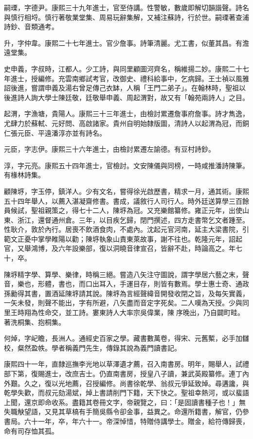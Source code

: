 \begin{pinyinscope}
嗣瑮，字德尹。康熙三十九年進士，官至侍講。性警敏，數歲即解切韻諧聲。詩名與慎行相埒。慎行著敬業堂集、周易玩辭集解，又補注蘇詩，行於世。嗣瑮著查浦詩鈔、音類通考。

升，字仲韋。康熙二十七年進士。官少詹事。詩筆清麗。尤工書，似董其昌。有澹遠堂集。

史申義，字叔時，江都人。少工詩，與同里顧圖河齊名，稱維揚二妙。康熙二十七年進士，授編修。充雲南鄉試考官，改御史、禮科給事中，乞病歸。王士禎以風雅詔後進，嘗謂申義及湯右曾足傳己衣缽，人稱「王門二弟子」。在翰林時，聖祖以後進詩人詢大學士陳廷敬，廷敬舉申義、周起渭對，故又有「翰苑兩詩人」之目。

起渭，字漁塘，貴陽人。康熙三十三年進士，由檢討累遷詹事府詹事。詩才雋逸，尤肆力於蘇軾、元好問、高啟諸家。貴州自明始隸版圖，清詩人以起渭為冠，而銅仁張元臣、平遠潘淳亦並有詩名。

元臣，字志伊。康熙三十六年進士，由檢討累遷左諭德。有豆村詩鈔。

淳，字元亮。康熙五十四年進士，官檢討。文安陳儀與同榜，一時咸推潘詩陳筆。有椽林詩集。

顧陳垿，字玉停，鎮洋人。少有文名，嘗得徐光啟歷書，精求一月，通其術。康熙五十四年舉人，以薦入湛凝齋修書。書成，議敘行人司行人。時外廷送算學三百餘員候試，聖祖親策之，得七十二人，陳垿為冠。又充樂館纂修。雍正元年，出使山東、浙江，還督通州倉。三年，以目疾乞歸，閉門撰述，四方走書幣乞文者踵至。性耿介，敦於內行。居喪不飲酒食肉，不處內。沈起元官河南，延主大梁書院，引範文正憂中掌學睢陽以勸；陳垿執象山責東萊故事，謝不往也。乾隆元年，詔起官，又舉鴻博，及六年設樂部，復以洞曉音律宣召，皆辭不赴，時論高之。年七十，卒。

陳垿精字學、算學、樂律，時稱三絕。嘗造八矢注守圖說，謂字學居六藝之末，聲音，樂也，形體，書也，而口出耳入，手運目存，則皆有數焉。學士惠士奇、通政孫勷得其書，置酒延陳垿請其說。陳垿為言經聲緯音開發收閉之旨，及每矢實義，一矢未發，則聲不能出，字有所避，八矢盡而音定字死矣。二人嘆為天授。少與同里王時翔為性命交，並工詩。婁東詩人大率宗吳偉業，陳序晚出，乃自闢町畦。著洗桐集、抱桐集。

何焯，字屺瞻，長洲人。通經史百家之學。藏書數萬卷，得宋、元舊槧，必手加讎校，粲然盈帙。學者稱義門先生，傳錄其說為義門讀書記。

康熙四十一年，直隸巡撫李光地以草澤遺才薦，召入南書房。明年，賜舉人，試禮部下第，復賜進士，改庶吉士。仍直南書房，授皇八子讀，兼武英殿纂修。連丁內外艱。久之，復以光地薦，召授編修。尚書徐乾學、翁叔元爭延致焯。尋遘讒，與乾學失歡，而叔元劾湯斌，焯上書請削門下籍，天下快之。聖祖幸熱河，或以蜚語上聞，還京即命收系。盡籍其卷冊文字，帝親覽之，曰：「是固讀書種子也！」無失職觖望語，又見其草槁有手簡吳縣令卻金事，益異之。命還所籍書，解官，仍參書局。六十一年，卒，年六十一。帝深悼惜，特贈侍講學士。贈金，給符傳歸喪，命有司存恤其孤。


\end{pinyinscope}
